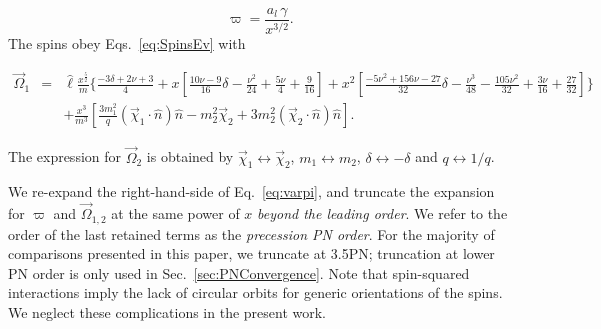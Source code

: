 \documentclass[aps,prd,amsmath,floatfix,twocolumn,superscriptaddress,nofootinbib,showpacs]{revtex4-1}
\newcommand{\ellHat}{\ensuremath{\hat{\ell}}}
\newcommand{\nHat}{\ensuremath{\hat{n}}}
\begin{document}
\begin{widetext}
\begin{equation}
\label{eq:varpi}
\varpi = \frac{a_l\,\gamma}{x^{3/2}}.
\end{equation}
%
The spins obey Eqs.~\eqref{eq:SpinsEv} with

\begin{eqnarray}
\label{eq:OmegaSpinsEv}
\vec{\Omega}_{1} &=&\ellHat\frac{x^{\frac{5}{2}}}{m} \Bigg\{
\frac{-3\delta+2\nu+3}{4}
+ x \left[\frac{10\nu-9}{16}\delta
 - \frac{\nu^2}{24}
    + \frac{5\nu}{4} + \frac{9}{16}\right]
  + x^{2} \left[
\frac{-5\nu^2+156\nu-27}{32}\delta
- \frac{\nu^3}{48} - \frac{105\nu^2}{32} + \frac{3\nu}{16}+
    \frac{27}{32}\right] \Bigg\} \nonumber \\
&&+ \frac{x^{3}}{m^3} \left[\frac{3m_{1}^{2}}{q}(\vec{\chi}_{1}\cdot\nHat) \nHat - m_2^{2}\vec{\chi}_{2} + 3m_{2}^{2}(\vec{\chi}_{2}\cdot\nHat)  \nHat\right].
\end{eqnarray}

The expression for $\vec{\Omega}_{2}$ is obtained by
$\vec{\chi}_{1}\leftrightarrow\vec{\chi}_{2}$, $m_{1}\leftrightarrow
m_{2}$, $\delta\leftrightarrow-\delta$ and $q \leftrightarrow 1/q$.

\end{widetext}
We re-expand the right-hand-side of Eq.~\eqref{eq:varpi}, and truncate
the expansion for $\varpi$ and $\vec\Omega_{1,2}$ at the same power of
$x$ \emph{beyond the leading order}.  We refer to the order of the
last retained terms as the \emph{precession PN order}.  For the
majority of comparisons presented in this paper, we truncate at 3.5PN;
truncation at lower PN order is only used in
Sec.~\ref{sec:PNConvergence}. Note that spin-squared interactions
imply the lack of circular orbits for generic orientations of the
spins. We neglect these complications in the present work.
\end{document}
